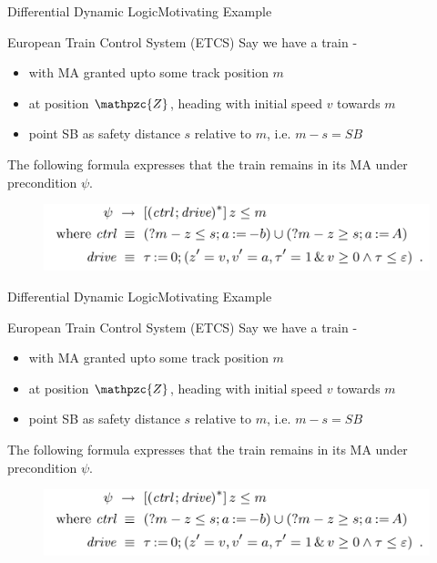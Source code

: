 \documentclass{beamer}
\newcommand{\z}{\mathpzc{Z}}
\begin{document}
\begin{frame}{Differential Dynamic Logic}{Motivating Example}
  \begin{block}{European Train Control System (ETCS)}
    Say we have a train -
    \begin{itemize}
      \item with MA granted upto some track position $m$
      \item at position $\z$, heading with initial speed $v$ towards $m$
      \item point SB as safety distance $s$ relative to $m$, i.e. $m-s = SB$
    \end{itemize}
    \pause
    The following formula expresses that the train remains in its MA under precondition $\psi$.
    \begin{figure}
      \includegraphics[scale=0.4]{ects-safety}
    \end{figure}
  \end{block}
  \end{frame}

\begin{frame}{Differential Dynamic Logic}{Motivating Example}
  \begin{block}{European Train Control System (ETCS)}
    Say we have a train -
    \begin{itemize}
      \item with MA granted upto some track position $m$
      \item at position $\z$, heading with initial speed $v$ towards $m$
      \item point SB as safety distance $s$ relative to $m$, i.e. $m-s = SB$
    \end{itemize}
    \pause
    The following formula expresses that the train remains in its MA under precondition $\psi$.
    \begin{figure}
      \includegraphics[scale=0.4]{ects-safety}
    \end{figure}
  \end{block}
  \end{frame}
\end{document}

